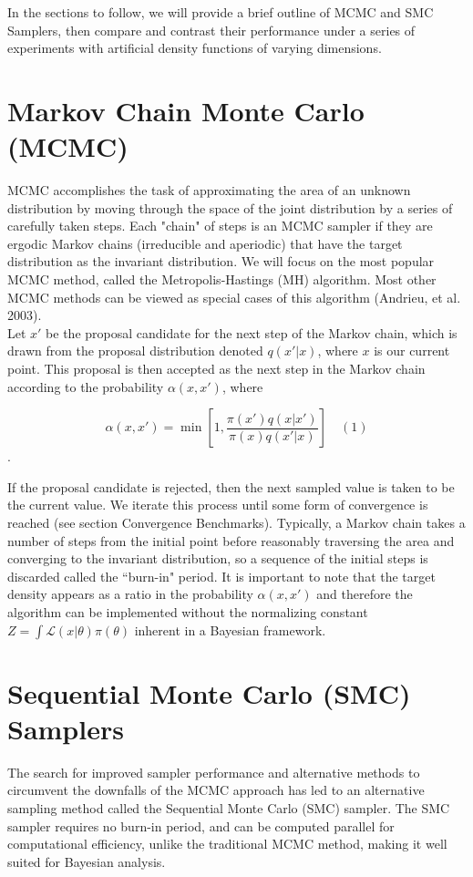 \documentclass[12pt]{elsarticle}
\begin{document}
In the sections to follow, we will provide a brief outline of MCMC and SMC Samplers, then compare and contrast their performance under a series of experiments with artificial density functions of varying dimensions.

\section*{Markov Chain Monte Carlo (MCMC)}
MCMC accomplishes the task of approximating the area of an unknown distribution by moving through the space of the joint distribution by a series of carefully taken steps. Each "chain" of steps is an MCMC sampler if they are ergodic Markov chains (irreducible and aperiodic) that have the target distribution as the invariant distribution.  We will focus on the most popular MCMC method, called the Metropolis-Hastings (MH) algorithm. Most other MCMC methods can be viewed as special cases of this algorithm (Andrieu, et al. 2003). \\

Let $x'$ be the proposal candidate for the next step of the Markov chain, which is drawn from the proposal distribution denoted $q(x'|x)$, where $x$ is our current point. This proposal is then accepted as the next step in the Markov chain according to the probability $\alpha(x,x')$, where 

\[
\alpha(x,x') = \min{\left[1, \frac{\pi(x') q(x|x')}{\pi(x)q(x'|x)}\right]} \quad (1)
\].

If the proposal candidate is rejected, then the next sampled value is taken to be the current value. We iterate this process until some form of convergence is reached (see section Convergence Benchmarks). Typically, a Markov chain takes a number of steps from the initial point before reasonably traversing the area and converging to the invariant distribution, so a sequence of the initial steps is discarded called the ``burn-in" period. It is important to note that the target density appears as a ratio in the probability $ \alpha(x,x')$ and therefore the algorithm can be implemented without the normalizing constant $Z = \int \mathcal{L}(x|\theta)\pi(\theta)$ inherent in a Bayesian framework.

\section*{Sequential Monte Carlo (SMC) Samplers}
The search for improved sampler performance and alternative methods to circumvent the downfalls of the MCMC approach has led to an alternative sampling method called the Sequential Monte Carlo (SMC) sampler. The SMC sampler requires no burn-in period, and can be computed parallel for computational efficiency, unlike the traditional MCMC method, making it well suited for Bayesian analysis. \\
\end{document}
